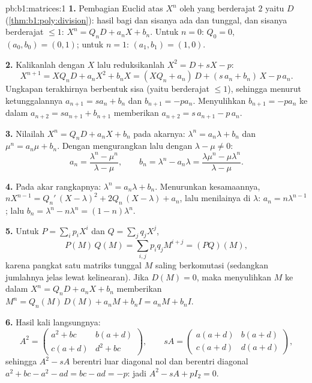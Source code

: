 \begin{solution}{pb:b1:matrices:1}
\textbf{1.} Pembagian Euclid atas $X^n$ oleh yang  berderajat $2$
yaitu $D$ (\cref{thm:b1:poly:division}): hasil bagi dan sisanya ada
dan tunggal, dan sisanya berderajat $\leq 1$: $X^n =
Q_n D + a_n X + b_n$. Untuk $n = 0$: $Q_0 = 0$, $(a_0, b_0) = (0,
1)$; untuk $n = 1$: $(a_1, b_1) = (1, 0)$.

\textbf{2.} Kalikanlah dengan $X$ lalu reduksikanlah $X^2 = D + sX - p$:
\[
X^{n+1} = X Q_n D + a_n X^2 + b_n X
= (X Q_n + a_n)\,D + (s\,a_n + b_n)\,X - p\,a_n .
\]
Ungkapan terakhirnya berbentuk sisa (yaitu berderajat $\leq 1$), sehingga menurut
ketunggalannya $a_{n+1} = s a_n + b_n$ dan $b_{n+1} = -p a_n$.
Menyulihkan $b_{n+1} = -pa_n$ ke dalam $a_{n+2} = s a_{n+1} +
b_{n+1}$ memberikan $a_{n+2} = s\,a_{n+1} - p\,a_n$.

\textbf{3.} Nilailah $X^n = Q_n D + a_n X + b_n$ pada akarnya:
$\lambda^n = a_n\lambda + b_n$ dan $\mu^n = a_n\mu + b_n$.
Dengan mengurangkan lalu  dengan $\lambda - \mu \neq 0$:
\[
a_n = \frac{\lambda^n - \mu^n}{\lambda - \mu},
\qquad
b_n = \lambda^n - a_n\lambda
= \frac{\lambda\mu^n - \mu\lambda^n}{\lambda - \mu} .
\]

\textbf{4.} Pada akar rangkapnya: $\lambda^n = a_n\lambda + b_n$.
Menurunkan kesamaannya, $nX^{n-1} = Q_n'\,(X - \lambda)^2
+ 2Q_n\,(X - \lambda) + a_n$, lalu menilainya di $\lambda$: $a_n
= n\lambda^{n-1}$; lalu $b_n = \lambda^n - n\lambda^{n} = (1 -
n)\lambda^{n}$.

\textbf{5.} Untuk $P = \sum_i p_i X^i$ dan $Q = \sum_j q_j X^j$,
\[
P(M)\,Q(M) = \sum_{i,j} p_i q_j M^{i+j} = (PQ)(M),
\]
karena pangkat satu matriks tunggal $M$ saling berkomutasi
(sedangkan jumlahnya jelas lewat kelinearan). Jika $D(M) = 0$, maka menyulihkan $M$
ke dalam $X^n = Q_n D + a_n X + b_n$ memberikan $M^n = Q_n(M)\,D(M) + a_n
M + b_n I = a_n M + b_n I$.

\textbf{6.} Hasil kali langsungnya:
\[
A^2 = \begin{pmatrix}
a^2 + bc & b(a + d)\\
c(a + d) & d^2 + bc
\end{pmatrix},
\qquad
s A = \begin{pmatrix}
a(a+d) & b(a+d)\\
c(a+d) & d(a+d)
\end{pmatrix},
\]
sehingga $A^2 - sA$ berentri luar diagonal nol dan berentri diagonal
$a^2 + bc - a^2 - ad = bc - ad = -p$: jadi $A^2 - sA + pI_2 = 0$.


\end{solution}

